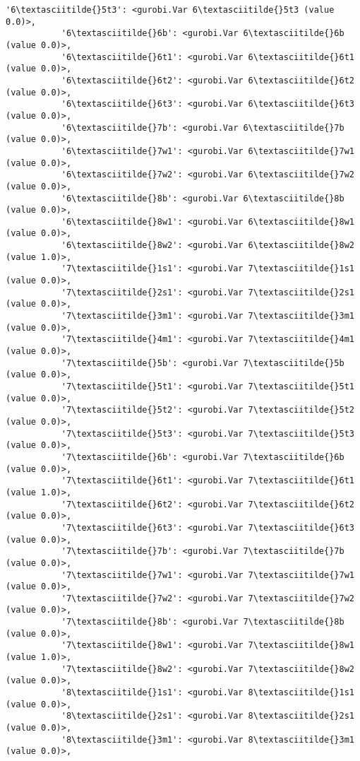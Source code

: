 \documentclass[11pt]{article}
\begin{document}
\begin{Verbatim}[commandchars=\\\{\}]
           '6\textasciitilde{}5t3': <gurobi.Var 6\textasciitilde{}5t3 (value 0.0)>,
           '6\textasciitilde{}6b': <gurobi.Var 6\textasciitilde{}6b (value 0.0)>,
           '6\textasciitilde{}6t1': <gurobi.Var 6\textasciitilde{}6t1 (value 0.0)>,
           '6\textasciitilde{}6t2': <gurobi.Var 6\textasciitilde{}6t2 (value 0.0)>,
           '6\textasciitilde{}6t3': <gurobi.Var 6\textasciitilde{}6t3 (value 0.0)>,
           '6\textasciitilde{}7b': <gurobi.Var 6\textasciitilde{}7b (value 0.0)>,
           '6\textasciitilde{}7w1': <gurobi.Var 6\textasciitilde{}7w1 (value 0.0)>,
           '6\textasciitilde{}7w2': <gurobi.Var 6\textasciitilde{}7w2 (value 0.0)>,
           '6\textasciitilde{}8b': <gurobi.Var 6\textasciitilde{}8b (value 0.0)>,
           '6\textasciitilde{}8w1': <gurobi.Var 6\textasciitilde{}8w1 (value 0.0)>,
           '6\textasciitilde{}8w2': <gurobi.Var 6\textasciitilde{}8w2 (value 1.0)>,
           '7\textasciitilde{}1s1': <gurobi.Var 7\textasciitilde{}1s1 (value 0.0)>,
           '7\textasciitilde{}2s1': <gurobi.Var 7\textasciitilde{}2s1 (value 0.0)>,
           '7\textasciitilde{}3m1': <gurobi.Var 7\textasciitilde{}3m1 (value 0.0)>,
           '7\textasciitilde{}4m1': <gurobi.Var 7\textasciitilde{}4m1 (value 0.0)>,
           '7\textasciitilde{}5b': <gurobi.Var 7\textasciitilde{}5b (value 0.0)>,
           '7\textasciitilde{}5t1': <gurobi.Var 7\textasciitilde{}5t1 (value 0.0)>,
           '7\textasciitilde{}5t2': <gurobi.Var 7\textasciitilde{}5t2 (value 0.0)>,
           '7\textasciitilde{}5t3': <gurobi.Var 7\textasciitilde{}5t3 (value 0.0)>,
           '7\textasciitilde{}6b': <gurobi.Var 7\textasciitilde{}6b (value 0.0)>,
           '7\textasciitilde{}6t1': <gurobi.Var 7\textasciitilde{}6t1 (value 1.0)>,
           '7\textasciitilde{}6t2': <gurobi.Var 7\textasciitilde{}6t2 (value 0.0)>,
           '7\textasciitilde{}6t3': <gurobi.Var 7\textasciitilde{}6t3 (value 0.0)>,
           '7\textasciitilde{}7b': <gurobi.Var 7\textasciitilde{}7b (value 0.0)>,
           '7\textasciitilde{}7w1': <gurobi.Var 7\textasciitilde{}7w1 (value 0.0)>,
           '7\textasciitilde{}7w2': <gurobi.Var 7\textasciitilde{}7w2 (value 0.0)>,
           '7\textasciitilde{}8b': <gurobi.Var 7\textasciitilde{}8b (value 0.0)>,
           '7\textasciitilde{}8w1': <gurobi.Var 7\textasciitilde{}8w1 (value 1.0)>,
           '7\textasciitilde{}8w2': <gurobi.Var 7\textasciitilde{}8w2 (value 0.0)>,
           '8\textasciitilde{}1s1': <gurobi.Var 8\textasciitilde{}1s1 (value 0.0)>,
           '8\textasciitilde{}2s1': <gurobi.Var 8\textasciitilde{}2s1 (value 0.0)>,
           '8\textasciitilde{}3m1': <gurobi.Var 8\textasciitilde{}3m1 (value 0.0)>,

\end{Verbatim}
\end{document}
